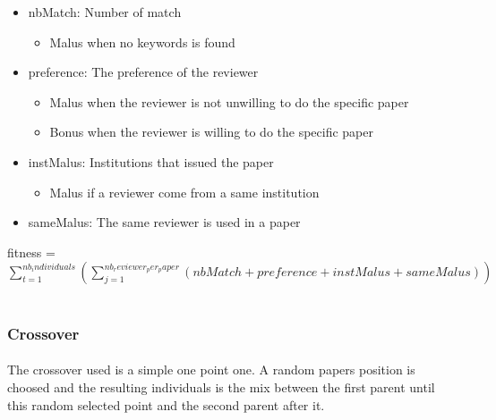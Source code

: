 \documentclass{article}
\begin{document}
        \begin{itemize}
          \item nbMatch: Number of match 
          \begin{itemize}
            \item Malus when no keywords is found
          \end{itemize}
          \item preference: The preference of the reviewer
          \begin{itemize}
            \item Malus when the reviewer is not unwilling to do the specific paper
            \item Bonus when the reviewer is willing to do the specific paper
          \end{itemize}

          \item instMalus: Institutions that issued the paper
          \begin{itemize}
            \item Malus if a reviewer come from a same institution  
          \end{itemize}
          \item sameMalus: The same reviewer is used in a paper 
        \end{itemize}

        
        fitness = $\sum_{t=1}^{nb_individuals} (\sum_{j=1}^{nb_reviewer_per_paper}( nbMatch +
        preference + instMalus + sameMalus)) $
        \\
        \\

    
    \subsubsection{Crossover} %
    \label{ssub:Crossover}
      
      \paragraph{} %
      \label{par:}
      The crossover used is a simple one point one. A random papers position is
      choosed and the resulting individuals is the mix between the first parent
      until this random selected point and the second parent after it.
      
\end{document}
